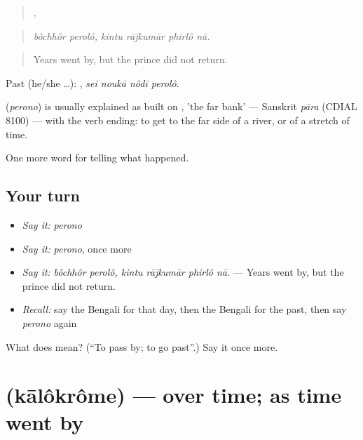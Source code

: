\begin{quote}
 ,    
\end{quote}

\begin{quote}
\emph{bôchhôr perolô, kintu rājkumār phirlô nā.}
\end{quote}

\begin{quote}
Years went by, but the prince did not return.
\end{quote}

Past (he/she …):    , \emph{sei noukā nôdī perolô}.

\begin{cousinweb}
\textbf{} (\emph{perono}) is usually explained as built on , 'the far bank' — Sanskrit \emph{pāra} (CDIAL 8100) — with the verb ending: to get to the far side of a river, or of a stretch of time.
\end{cousinweb}

\begin{grammarlens}[title={What you've built}]
One more word for telling what happened.
\end{grammarlens}

\subsection*{Your turn}
\begin{itemize}
\raggedright
  \item \emph{Say it:} \emph{perono}
  \item \emph{Say it:} \emph{perono}, once more
  \item \emph{Say it:} \emph{bôchhôr perolô, kintu rājkumār phirlô nā.} — Years went by, but the prince did not return.
  \item \emph{Recall:} say the Bengali for that day, then the Bengali for the past, then say \emph{perono} again
\end{itemize}

\begin{tcolorbox}[breakable,colback=teal!4,colframe=teal!35!black,title={Before you move on}]
What does  mean? (\textquotedblleft{}To pass by; to go past\textquotedblright{}.) Say it once more.
\end{tcolorbox}
\section[\texorpdfstring{\bn{কালক্রমে} (kālôkrôme)}{কালক্রমে (kālôkrôme)}]{ (kālôkrôme) — over time; as time went by}

